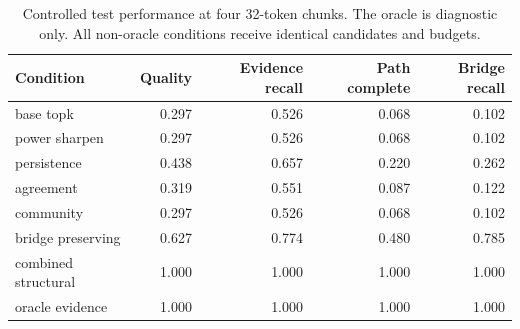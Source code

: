 \begin{table}[H]\centering\small
\begin{tabular}{lrrrr}\toprule
Condition & Quality & Evidence recall & Path complete & Bridge recall \\\midrule
base topk & 0.297 & 0.526 & 0.068 & 0.102 \\
power sharpen & 0.297 & 0.526 & 0.068 & 0.102 \\
persistence & 0.438 & 0.657 & 0.220 & 0.262 \\
agreement & 0.319 & 0.551 & 0.087 & 0.122 \\
community & 0.297 & 0.526 & 0.068 & 0.102 \\
bridge preserving & 0.627 & 0.774 & 0.480 & 0.785 \\
combined structural & 1.000 & 1.000 & 1.000 & 1.000 \\
oracle evidence & 1.000 & 1.000 & 1.000 & 1.000 \\
\bottomrule\end{tabular}
\caption{Controlled test performance at four 32-token chunks. The oracle is diagnostic only. All non-oracle conditions receive identical candidates and budgets.}
\label{tab:paper1-main}
\end{table}
